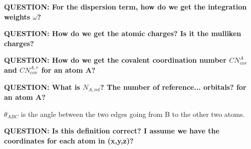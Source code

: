 \documentclass{article}
\newcommand{\q}[1]{\textbf{QUESTION: #1}}
\begin{document}
\vspace{10pt}
\noindent
\q{For the dispersion term, how do we get the integration weights \(\omega\)?}

\vspace{10pt}
\noindent
\q{How do we get the atomic charges? Is it the mulliken charges?}


\vspace{10pt}
\noindent
\q{How do we get the covalent coordination number \(CN_\text{cov}^A\) and \(CN_\text{cov}^{A,r}\) for an atom A?}

\vspace{10pt}
\noindent
\q{What is \(N_{A,\text{ref}}\)? The number of reference... orbitals? for an atom A?}


\vspace{10pt}
\noindent
\(\theta_{ABC}\) is the angle between the two edges going from B to the other two atoms.

\noindent
\q{Is this definition correct? I assume we have the coordinates for each atom in (x,y,z)?}
\end{document}
